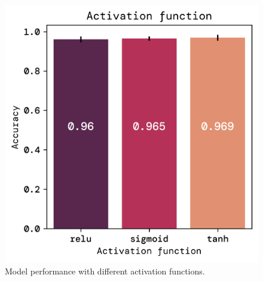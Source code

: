\documentclass[twoside,11pt]{report}
\begin{document}
    \begin{figure}[!ht]
        \begin{minipage}[t]{0.5\textwidth - 1mm}
            \begin{center}
                \includegraphics[width=\textwidth]{../runsAndFigures/accuracy_activ.png}
            \end{center}
            \caption
            {
                Model performance with different activation functions.
            }\label{fig:accuracy_activ}
        \end{minipage}
        \hspace{2mm}
        \begin{minipage}[t]{0.5\textwidth - 1mm}
            \begin{center}

\end{center}
\end{minipage}
\end{figure}
\end{document}
